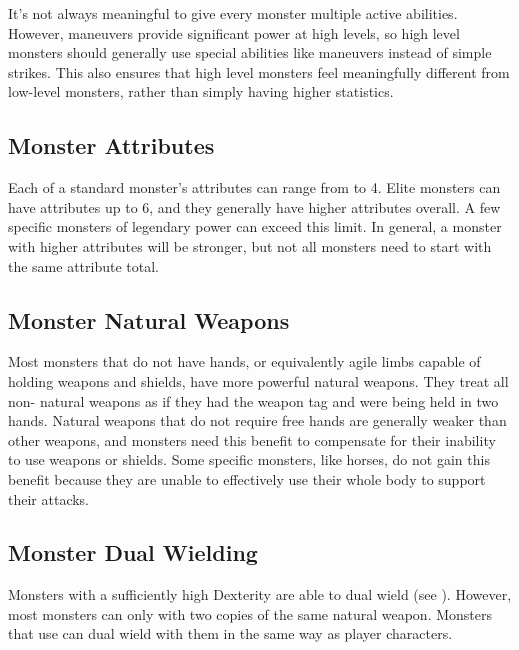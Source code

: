             It's not always meaningful to give every monster multiple active abilities.
            However, maneuvers provide significant power at high levels, so high level monsters should generally use special abilities like maneuvers instead of simple strikes.
            This also ensures that high level monsters feel meaningfully different from low-level monsters, rather than simply having higher statistics.

    \subsection{Monster Attributes}\label{Monster Attributes}
        Each of a standard monster's attributes can range from  to 4.
        Elite monsters can have attributes up to 6, and they generally have higher attributes overall.
        A few specific monsters of legendary power can exceed this limit.
        In general, a monster with higher attributes will be stronger, but not all monsters need to start with the same attribute total.

    \subsection{Monster Natural Weapons}\label{Monster Natural Weapon}
        Most monsters that do not have hands, or equivalently agile limbs capable of holding weapons and shields, have more powerful natural weapons.
        They treat all non- natural weapons as if they had the  weapon tag and were being held in two hands.
        Natural weapons that do not require free hands are generally weaker than other weapons, and monsters need this benefit to compensate for their inability to use weapons or shields.
        Some specific monsters, like horses, do not gain this benefit because they are unable to effectively use their whole body to support their attacks.

    \subsection{Monster Dual Wielding}\label{Monster Dual Wielding}
        Monsters with a sufficiently high Dexterity are able to dual wield (see ).
        However, most monsters can only  with two copies of the same  natural weapon.
        Monsters that use  can dual wield with them in the same way as player characters.

